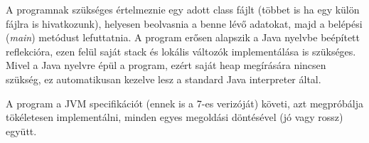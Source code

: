 A programnak szükséges értelmeznie egy adott class fájlt (többet is ha egy külön fájlra is hivatkozunk), helyesen beolvasnia a benne lévő adatokat, majd a belépési (\textit{main}) metódust lefuttatnia. A program erősen alapszik a Java nyelvbe beépített reflekcióra, ezen felül saját stack és lokális változók implementálása is szükséges. Mivel a Java nyelvre épül a program, ezért saját heap megírására nincsen szükség, ez automatikusan kezelve lesz a standard Java interpreter által.

A program a JVM specifikációt\cite{jvm_specification} (ennek is a 7-es verizóját) követi, azt megpróbálja tökéletesen implementálni, minden egyes megoldási döntésével (jó vagy rossz) együtt.